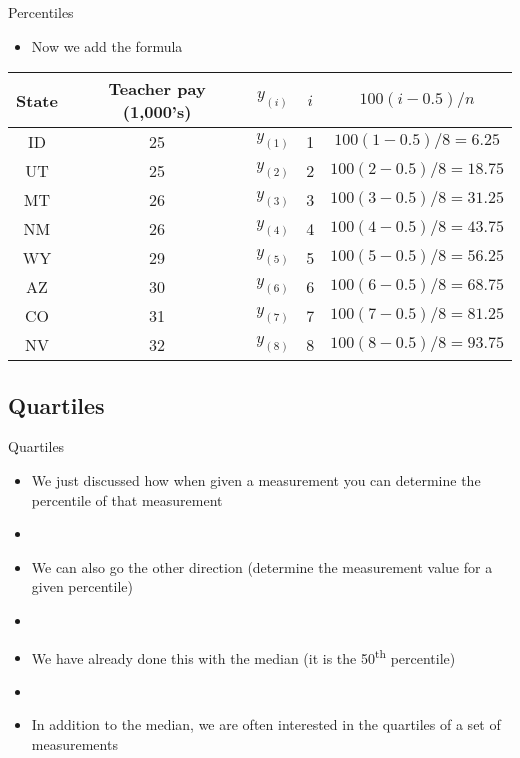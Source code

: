 \documentclass[xcolor=dvipsnames]{beamer}
\begin{document}
\begin{frame}{Percentiles}
	\begin{itemize}
		\item Now we add the formula
	\end{itemize}
	\begin{center}
		\begin{tabular}{|c|c|c|c|c|}
			\hline 
			\textbf{State} & \textbf{Teacher pay (1,000's)} & $y_{(i)}$ & $i$ & $100(i - 0.5)/n$ \\ 
			\hline \hline 
			ID & 25 & $y_{(1)}$& 1 & $100(1 - 0.5)/8 = 6.25$ \\  \hline 
			UT &  25  & $y_{(2)}$& 2& $100(2 - 0.5)/8 = 18.75$\\ \hline 
			MT &  26  & $y_{(3)}$& 3& $100(3 - 0.5)/8 = 31.25$\\ \hline 
			NM &  26  & $y_{(4)}$& 4& $100(4 - 0.5)/8 = 43.75$\\ \hline 
			WY &  29  & $y_{(5)}$& 5& $100(5 - 0.5)/8 = 56.25$\\ \hline 
			AZ & 30  & $y_{(6)}$& 6& $100(6 - 0.5)/8 = 68.75$\\ \hline 
			CO &  31 & $y_{(7)}$& 7& $100(7 - 0.5)/8 = 81.25$\\ \hline
			NV & 32  & $y_{(8)}$& 8& $100(8 - 0.5)/8 = 93.75$\\ \hline 
		\end{tabular} 
	\end{center}
\end{frame}

\subsection{Quartiles}
\begin{frame}{Quartiles}
	\begin{itemize}
		\item We just discussed how when given a measurement you can determine the percentile of that measurement
		\item[]
		\item We can also go the other direction (determine the measurement value for a given percentile)
		\item[]
		\item We have already done this with the median (it is the 50\textsuperscript{th} percentile)
		\item[]
		\item In addition to the median, we are often interested in the quartiles of a set of measurements		
	\end{itemize}
\end{frame}
\end{document}
